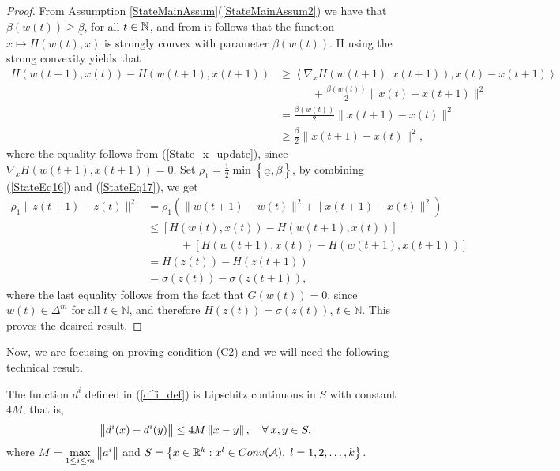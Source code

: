 \begin{proof}
From Assumption \ref{StateMainAssum}(\ref{StateMainAssum2}) we have that $\beta(w(t)) \geq \underline{\beta}$, for all $t \in \mathbb{N}$, and from  it follows that the function $x \mapsto H(w(t),x)$ is strongly convex with parameter $\beta(w(t))$. H using the strong convexity yields that
\begin{align}
	H(w(t+1),x(t))  - H(w(t+1),x(t+1)) &\geq \left\langle \nabla_x H(w(t+1),x(t+1)) , x(t)-x(t+1) \right\rangle \nonumber \\
	&\quad\quad\quad + \frac{\beta(w(t))}{2} \|x(t) - x(t+1)\|^2 \nonumber \\
	& = \frac{\beta(w(t))}{2} \|x(t+1) - x(t)\|^2  \nonumber \\
	& \geq \frac{\underline{\beta}}{2} \|x(t+1) - x(t)\|^2 , \label{StateEq17}
\end{align}
where the equality follows from (\ref{State_x_update}), since $\nabla_{x} H(w(t+1), x(t+1)) = 0$.
Set $\rho_1 = \frac{1}{2}\min\left\lbrace \underline{\alpha} , \underline{\beta} \right\rbrace$, by combining (\ref{StateEq16}) and (\ref{StateEq17}), we get
\begin{align*}
	\rho_1 \|z(t+1)- z(t)\|^2 
	&= \rho_1 \left( \|w(t+1) - w(t)\|^2 + \|x(t+1) - x(t)\|^2  \right) \\
	&\leq \left[ H(w(t),x(t)) - H(w(t+1),x(t)) \right] \\
	&\quad\quad\quad + \left[ H(w(t+1),x(t)) - H(w(t+1),x(t+1)) \right] \\
	&= H(z(t)) - H(z(t+1)) \\
	&= \sigma(z(t)) - \sigma(z(t+1)),
\end{align*}
where the last equality follows from the fact that $G(w(t)) = 0$, since $w(t) \in \Delta^m$ for all $t \in \mathbb{N}$, and therefore $H(z(t))=\sigma(z(t))$, $t \in \mathbb{N}$. This proves the desired result.
\end{proof}

Now, we are focusing on proving condition (C2) and we will need the following technical result.

\begin{lemma} \label{StateEq11}
The function $d^i$ defined in (\ref{d^i_def}) is Lipschitz continuous in $S$ with constant $4M$, that is,
\begin{equation*}
	\left\Vert {d^i(x) - d^i(y)} \right\Vert \leq 4M \left\Vert {x - y} \right\Vert, \quad \forall \: x,y \in S,
\end{equation*}
where $M = \max\limits_{1 \leq i \leq m} \left\Vert {a^i} \right\Vert$ and  $S=\left\lbrace x \in \mathbb{R}^k : x^l \in Conv(\mathcal{A}), \; l=1,2,\ldots,k \right\rbrace$.
\end{lemma}


